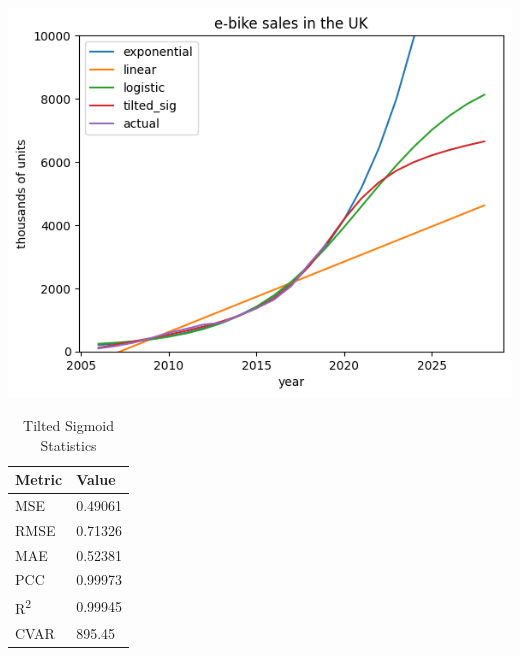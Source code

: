 \begin{table}[h]
    \begin{minipage}{0.7\linewidth}
        \centering
        \includegraphics[width=\textwidth]{titled-sigmoid}%
        \label{fig:tilted}
    \end{minipage}%
    \begin{minipage}{0.3\linewidth}
        \centering
        \begin{tabular}{ll}
            \toprule
            Metric               & Value   \\
            \midrule
            MSE                  & 0.49061 \\
            RMSE                 & 0.71326 \\
            MAE                  & 0.52381 \\
            PCC                  & 0.99973 \\
            R\textsuperscript{2} & 0.99945 \\
            CVAR                 & 895.45  \\
            \bottomrule
        \end{tabular}
        \vspace{8pt}
        \caption{Tilted Sigmoid Statistics}
        \label{tab:t}
    \end{minipage}
\end{table}
